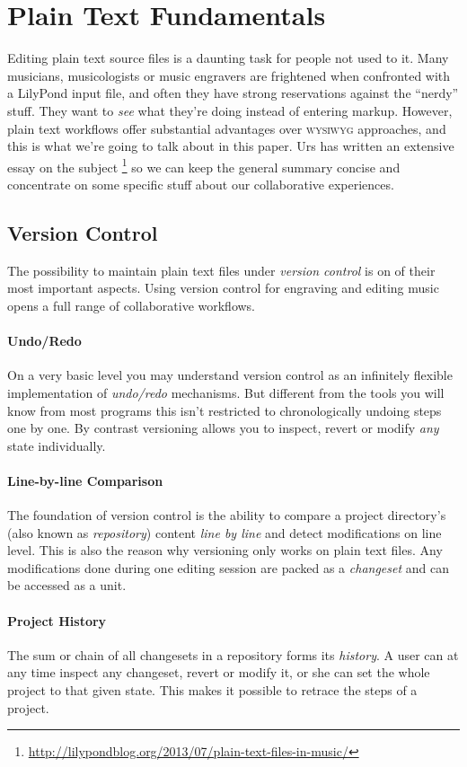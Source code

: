 \documentclass[11pt,a4paper]{article}
\begin{document}
\section{Plain Text Fundamentals}
Editing plain text source files is a daunting task for people not used to it.
Many musicians, musicologists or music engravers are frightened when
confronted with a LilyPond input file, and often they have strong reservations
against the “nerdy” stuff. They want to \emph{see} what they're doing instead of entering
markup. However, plain text workflows offer substantial advantages over \textsc{wysiwyg}
approaches, and this is what we're going to talk about in this paper. Urs has written
an extensive essay on the subject%
\footnote{\url{http://lilypondblog.org/2013/07/plain-text-files-in-music/}}
so we can keep the general summary concise and concentrate on some specific stuff
about our collaborative experiences.

\subsection{Version Control}
The possibility to maintain plain text files under \emph{version control} is on of
their most important aspects. Using version control for engraving and editing music
opens a full range of collaborative workflows.

\paragraph{Undo/Redo}
On a very basic level you may understand version control as an infinitely flexible
implementation of \emph{undo/redo} mechanisms. But different from the tools you will
know from most programs this isn't restricted to chronologically undoing steps one by
one. By contrast versioning allows you to inspect, revert or modify \emph{any} state
individually.

\paragraph{Line-by-line Comparison}
The foundation of version control is the ability to compare a project directory's (also
known as \emph{repository}) content \emph{line by line} and detect modifications on line
level. This is also the reason why versioning only works on plain text files.
Any modifications done during one editing session are packed as a \emph{changeset} and
can be accessed as a unit.

\paragraph{Project History}
The sum or chain of all changesets in a repository forms its \emph{history}. A user can 
at any time inspect any changeset, revert or modify it, or she can set the whole project
to that given state. This makes it possible to retrace the steps of a project.
\end{document}
